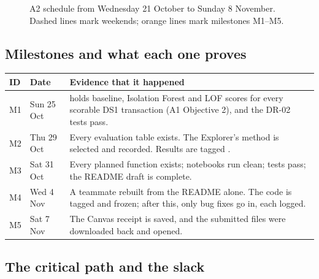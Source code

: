 \begin{figure}[H]
{}
\caption{A2 schedule from Wednesday 21 October to Sunday 8 November. Dashed lines mark weekends;
orange lines mark milestones M1--M5.}
\end{figure}

\subsection{Milestones and what each one proves}

\begin{center}
\small
\begin{tabularx}{\textwidth}{@{}L{1.0cm}L{2.2cm}Y@{}}
\toprule
\textbf{ID} & \textbf{Date} & \textbf{Evidence that it happened} \\
\midrule
M1 & Sun 25 Oct &  holds baseline, Isolation Forest and LOF scores for every scorable DS1 transaction (A1 Objective 2), and the DR-02 tests pass. \\
M2 & Thu 29 Oct & Every evaluation table exists. The Explorer's method is selected and recorded. Results are tagged . \\
M3 & Sat 31 Oct & Every planned function exists; notebooks run clean; tests pass; the README draft is complete. \\
M4 & Wed 4 Nov & A teammate rebuilt  from the README alone. The code is tagged  and frozen; after this, only bug fixes go in, each logged. \\
M5 & Sat 7 Nov & The Canvas receipt is saved, and the submitted files were downloaded back and opened. \\
\bottomrule
\end{tabularx}
\end{center}

\subsection{The critical path and the slack}

